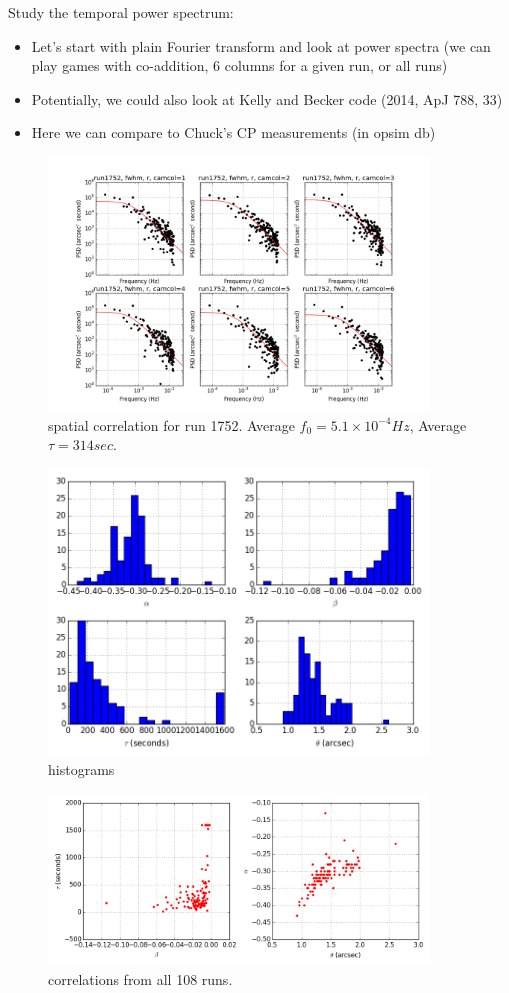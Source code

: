 Study the temporal power spectrum:
\begin{itemize}
\item Let's start with plain Fourier transform and look at power spectra (we can 
    play games with co-addition, 6 columns for a given run, or all runs)
\item Potentially, we could also look at  Kelly and Becker code  (2014, ApJ 788, 33) 
\item Here we can compare to Chuck's CP measurements (in opsim db) 
\end{itemize} 

\begin{figure}
\centering
\includegraphics[width=0.9\textwidth]{FIGURES/temporal.png}
\caption{spatial correlation for run 1752. Average
  $f_0 = 5.1\times 10^{-4} Hz$, Average $\tau = 314 sec.$ 
\label{fig:psd}}
\end{figure}

\begin{figure}
\centering
\includegraphics[width=0.9\textwidth]{FIGURES/hist.png}
\caption{histograms
\label{fig:hist}}
\end{figure}


\begin{figure}
\centering
\includegraphics[width=0.9\textwidth]{FIGURES/correlate.png}
\caption{correlations  from all 108 runs.
\label{fig:correlate}}
\end{figure}



